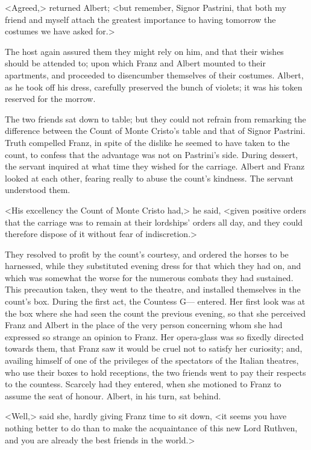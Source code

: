  <Agreed,> returned Albert; <but remember, Signor Pastrini, that both my friend and myself attach the greatest importance to having tomorrow the costumes we have asked for.> 

 The host again assured them they might rely on him, and that their wishes should be attended to; upon which Franz and Albert mounted to their apartments, and proceeded to disencumber themselves of their costumes. Albert, as he took off his dress, carefully preserved the bunch of violets; it was his token reserved for the morrow. 

 The two friends sat down to table; but they could not refrain from remarking the difference between the Count of Monte Cristo's table and that of Signor Pastrini. Truth compelled Franz, in spite of the dislike he seemed to have taken to the count, to confess that the advantage was not on Pastrini's side. During dessert, the servant inquired at what time they wished for the carriage. Albert and Franz looked at each other, fearing really to abuse the count's kindness. The servant understood them. 

 <His excellency the Count of Monte Cristo had,> he said, <given positive orders that the carriage was to remain at their lordships' orders all day, and they could therefore dispose of it without fear of indiscretion.> 

 They resolved to profit by the count's courtesy, and ordered the horses to be harnessed, while they substituted evening dress for that which they had on, and which was somewhat the worse for the numerous combats they had sustained.  This precaution taken, they went to the theatre, and installed themselves in the count's box. During the first act, the Countess G— entered. Her first look was at the box where she had seen the count the previous evening, so that she perceived Franz and Albert in the place of the very person concerning whom she had expressed so strange an opinion to Franz. Her opera-glass was so fixedly directed towards them, that Franz saw it would be cruel not to satisfy her curiosity; and, availing himself of one of the privileges of the spectators of the Italian theatres, who use their boxes to hold receptions, the two friends went to pay their respects to the countess. Scarcely had they entered, when she motioned to Franz to assume the seat of honour. Albert, in his turn, sat behind. 

 <Well,> said she, hardly giving Franz time to sit down, <it seems you have nothing better to do than to make the acquaintance of this new Lord Ruthven, and you are already the best friends in the world.> 


